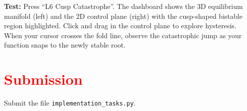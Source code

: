 \documentclass[11pt]{article}
\begin{document}
\textbf{Test:} Press ``L6 Cusp Catastrophe''. The dashboard shows the 3D equilibrium manifold (left) and the 2D control plane (right) with the cusp-shaped bistable region highlighted. Click and drag in the control plane to explore hysteresis. When your cursor crosses the fold line, observe the catastrophic jump as your function snaps to the newly stable root.

\section*{\textcolor{red}{Submission}}
Submit the file \texttt{implementation\_tasks.py}.
\end{document}
